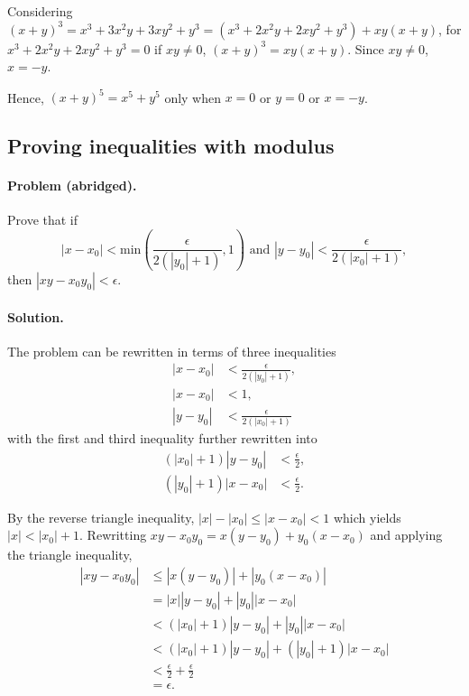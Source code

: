 \documentclass{article}
\begin{document}
Considering $(x + y)^3 = x^3 + 3x^2y + 3xy^2 + y^3 = (x^3 + 2x^2y + 2xy^2 +
y^3) + xy(x + y)$, for $x^3 + 2x^2y + 2xy^2 + y^3 = 0$ if $xy \neq 0$, $(x +
y)^3 = xy(x + y)$. Since $xy \neq 0$, $x = -y$.

Hence, $(x + y)^5 = x^5 + y^5$ only when $x = 0$ or $y = 0$ or $x = -y$.

\setcounter{subsection}{20}
\subsection{Proving inequalities with modulus}

\paragraph{Problem (abridged).} Prove that if \begin{equation*}
  |x - x_0| < \mathrm{min}\left(\frac{\epsilon}{2(|y_0| + 1)}, 1\right) \text{ and } |y
  - y_0| < \frac{\epsilon}{2(|x_0| + 1)},
\end{equation*} then $|xy - x_0y_0| < \epsilon$.

\paragraph{Solution.} The problem can be rewritten in terms of three
inequalities \begin{align*}
  |x - x_0| &< \frac{\epsilon}{2(|y_0| + 1)}, \\
  |x - x_0| &< 1, \\
  |y - y_0| &< \frac{\epsilon}{2(|x_0| + 1)}
\end{align*} with the first and third inequality further rewritten into
\begin{align*}
  (|x_0| + 1)|y - y_0| &< \frac{\epsilon}{2}, \\
  (|y_0| + 1)|x - x_0| &< \frac{\epsilon}{2}.
\end{align*}

By the reverse triangle inequality, $|x| - |x_0| \leq |x - x_0| < 1$ which
yields $|x| < |x_0| + 1$. Rewritting $xy - x_0y_0 = x(y - y_0) + y_0(x - x_0)$
and applying the triangle inequality, \begin{align*}
  |xy - x_0y_0| &\leq |x(y - y_0)| + |y_0(x - x_0)| \\
    &= |x||y - y_0| + |y_0||x - x_0| \\
    &< (|x_0| + 1)|y - y_0| + |y_0||x - x_0| \\
    &< (|x_0| + 1)|y - y_0| + (|y_0| + 1)|x - x_0| \\
    &< \frac{\epsilon}{2} + \frac{\epsilon}{2} \\
    &= \epsilon.
\end{align*}
\end{document}
